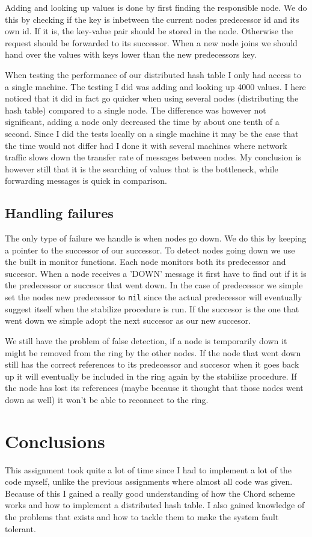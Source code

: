 \documentclass[a4paper, 11pt]{article}
\begin{document}
Adding and looking up values is done by first finding the responsible node. We do this by checking if the key is inbetween the current nodes predecessor id and its own id. If it is, the key-value pair should be stored in the node. Otherwise the request should be forwarded to its successor. When a new node joins we should hand over the values with keys lower than the new predecessors key.

When testing the performance of our distributed hash table I only had access to a single machine. The testing I did was adding and looking up 4000 values. I here noticed that it did in fact go quicker when using several nodes (distributing the hash table) compared to a single node. The difference was however not significant, adding a node only decreased the time by about one tenth of a second. Since I did the tests locally on a single machine it may be the case that the time would not differ had I done it with several machines where network traffic slows down the transfer rate of messages between nodes. My conclusion is however still that it is the searching of values that is the bottleneck, while forwarding messages is quick in comparison.

\subsection{Handling failures}

The only type of failure we handle is when nodes go down. We do this by keeping a pointer to the successor of our successor. To detect nodes going down we use the built in monitor functions. Each node monitors both its predecessor and succesor. When a node receives a 'DOWN' message it first have to find out if it is the predecessor or succesor that went down. In the case of predecessor we simple set the nodes new predecessor to \texttt{nil} since the actual predecessor will eventually suggest itself when the stabilize procedure is run. If the succesor is the one that went down we simple adopt the next succesor as our new succesor.

We still have the problem of false detection, if a node is temporarily down it might be removed from the ring by the other nodes. If the node that went down still has the correct references to its predecessor and succesor when it goes back up it will eventually be included in the ring again by the stabilize procedure. If the node has lost its references (maybe because it thought that those nodes went down as well) it won't be able to reconnect to the ring.

\section{Conclusions}

This assignment took quite a lot of time since I had to implement a lot of the code myself, unlike the previous assignments where almost all code was given. Because of this I gained a really good understanding of how the Chord scheme works and how to implement a distributed hash table. I also gained knowledge of the problems that exists and how to tackle them to make the system fault tolerant.
\end{document}
